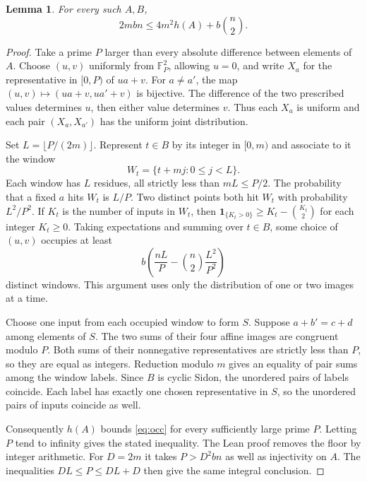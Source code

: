 \documentclass[11pt]{article}
\newtheorem{lemma}[theorem]{Lemma}
\newcommand{\F}{\mathbb F}
\begin{document}
\begin{lemma}\label{lem:template}
For every such \(A,B\),
\[
  2mbn\le 4m^2 h(A)+b\binom n2 .
\]
\end{lemma}
\begin{proof}
Take a prime \(P\) larger than every absolute difference between elements
of \(A\). Choose \((u,v)\) uniformly from \(\F_P^2\), allowing \(u=0\),
and write \(X_a\) for the representative in \([0,P)\) of \(ua+v\).
For \(a\ne a'\), the map \((u,v)\mapsto(ua+v,ua'+v)\) is bijective.
The difference of the two prescribed values determines \(u\), then either
value determines \(v\). Thus each \(X_a\) is uniform and each pair
\((X_a,X_{a'})\) has the uniform joint distribution.

Set \(L=\lfloor P/(2m)\rfloor\). Represent \(t\in B\) by its integer
in \([0,m)\) and associate to it the window
\[
 W_t=\{t+mj:0\le j<L\}.
\]
Each window has \(L\) residues, all strictly less than \(mL\le P/2\).
The probability that a fixed \(a\) hits \(W_t\) is \(L/P\). Two distinct
points both hit \(W_t\) with probability \(L^2/P^2\). If \(K_t\) is the
number of inputs in \(W_t\), then
\(\mathbf1_{\{K_t>0\}}\ge K_t-\binom{K_t}{2}\) for each integer
\(K_t\ge0\). Taking expectations and summing over \(t\in B\), some
choice of \((u,v)\) occupies at least
\begin{equation}\label{eq:occ}
  b\left(\frac{nL}{P}-\binom n2\frac{L^2}{P^2}\right)
\end{equation}
distinct windows. This argument uses only the distribution of one or two
images at a time.

Choose one input from each occupied window to form \(S\).
Suppose \(a+b'=c+d\) among elements of \(S\). The two sums of their four
affine images are congruent modulo \(P\). Both sums of their nonnegative
representatives are strictly less than \(P\), so they are equal as
integers. Reduction modulo \(m\) gives an equality of pair sums among the
window labels. Since \(B\) is cyclic Sidon, the unordered pairs of labels
coincide. Each label has exactly one chosen representative in \(S\), so
the unordered pairs of inputs coincide as well.

Consequently \(h(A)\) bounds \eqref{eq:occ} for every sufficiently
large prime \(P\). Letting \(P\) tend to infinity gives the stated inequality.
The Lean proof removes the floor by integer arithmetic. For \(D=2m\)
it takes \(P>D^2bn\) as well as injectivity on \(A\). The inequalities
\(DL\le P\le DL+D\) then give the same integral conclusion.
\end{proof}
\end{document}
